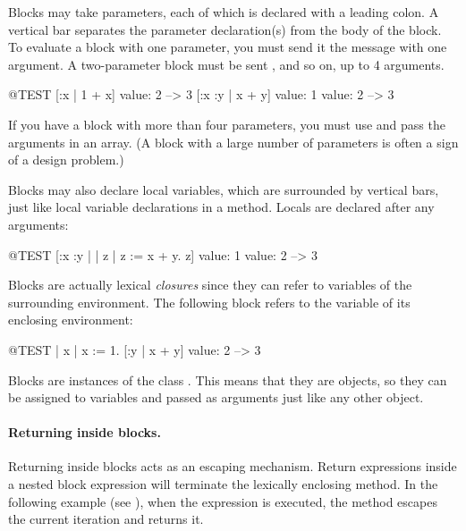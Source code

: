 \documentclass[a4paper,10pt,twoside]{book}
\begin{document}
Blocks may take parameters, each of which is declared with a leading colon.
A  vertical bar separates the parameter declaration(s) from the body of the block.
To evaluate a block with one parameter, you must send it the message  with one argument.
A two-parameter block must be sent , and so on, up to 4 arguments.

\begin{code}{@TEST}
[:x | 1 + x] value: 2 --> 3
[:x :y | x + y] value: 1 value: 2 --> 3
\end{code}

If you have a block with more than four parameters, you must use  and pass the arguments in an array.
(A block with a large number of parameters is often a sign of a design problem.)

Blocks may also declare local variables, which are surrounded by vertical bars, just like local variable declarations in a method.
Locals are declared after any arguments:

\begin{code}{@TEST}
[:x :y | | z | z := x + y. z] value: 1 value: 2 --> 3
\end{code}

Blocks are actually lexical \emph{closures} since they can refer to variables of the surrounding environment.
The following block refers to the variable  of its enclosing environment:

\begin{code}{@TEST}
| x |
x := 1.
[:y | x + y] value: 2 --> 3
\end{code}

Blocks are instances of the class .
This means that they are objects, so they can be assigned to variables and passed as arguments just like any other object.

\paragraph{Returning inside blocks.}
Returning inside blocks acts as an escaping mechanism. 
Return expressions inside a nested block expression will terminate the lexically enclosing method.
In the following example (see ), when the expression  is executed, the method  escapes the current iteration and returns it. 
\end{document}
